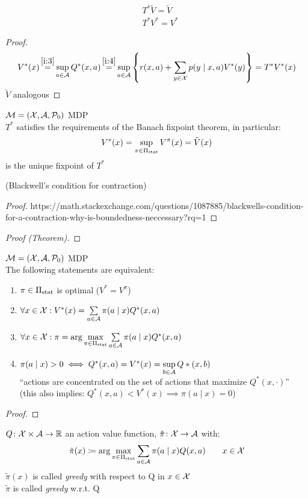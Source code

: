 \begin{corollary}
	\begin{align*}
	&T^*\tilde{V}=\tilde{V}\\
	&T^*V^*=V^*
	\end{align*}
\end{corollary}
\begin{proof}
\begin{align*}
	V^*(x)\xeq{\ref{i:3}}\sup_{a\in\cA}Q^*(x,a)\xeq{\ref{i:4}}\sup_{a\in\cA}\left\{r(x,a)+\sum_{y\in\cX}p(y\mid x,a) V^*(y)\right\} =T^*V^*(x)
\end{align*}
\(\tilde{V}\) analogous
\end{proof}
\begin{thm}\(\mathcal{M}=(\mathcal{X},\mathcal{A},\mathcal{P}_0)\) MDP\\
\(T^*\) satisfies the requirements of the Banach fixpoint theorem, in particular:
	\[V^*(x)=\sup_{\pi\in\Pi_{\textnormal{stat}}}V^\pi(x)=\tilde{V}(x) \]
is the unique fixpoint of \(T^*\)
\end{thm}
\begin{lemma}(Blackwell's condition for contraction)
\end{lemma}
\begin{proof}
https://math.stackexchange.com/questions/1087885/blackwells-condition-for-a-contraction-why-is-boundedness-neccessary?rq=1
\end{proof}
\begin{proof}[Proof (Theorem)]
\end{proof}
\begin{prop}\label{sup is attained}\(\mathcal{M}=(\mathcal{X},\mathcal{A},\mathcal{P}_0)\) MDP\\
The following statements are equivalent:
\begin{enumerate}[label={(\roman*)},font=\normalfont]
\item \(\pi \in\Pi_{\textnormal{stat}}\) is optimal (\(V^*=V^\pi\))
\item \(\forall x\in\mathcal{X}: V^*(x)=\sum\limits_{a\in\mathcal{A}}\pi(a\mid x)Q^*(x,a)\)
\item\label{ii:3} \(\forall x\in\mathcal{X}: \pi=\arg\max\limits_{\pi\in\Pi_{\textnormal{stat}}}\sum\limits_{a\in\mathcal{A}}\pi(a\mid x)Q^*(x,a) \)
\item \(\pi(a\mid x)>0 \iff Q^*(x,a)=V^*(x) =\sup\limits_{b\in\mathcal{A}}Q*(x,b)\) \\
	``actions are concentrated on the set of actions that maximize \(Q^*(x,\cdot)\)''\\
	(this also implies: \(Q^*(x,a)<V^*(x) \implies \pi(a\mid x)=0\))
\end{enumerate}
\end{prop}
\begin{proof}
\end{proof}
\begin{definition}
	\(Q\colon\mathcal{X}\times\mathcal{A}\to\mathbb{R}\) an action value function, \(\tilde{\pi}\colon\mathcal{X}\to\mathcal{A}\) with:
	\[
	\tilde{\pi}(x)\coloneqq\arg\max_{\pi\in\Pi_{\textnormal{stat}}}\sum_{a\in\mathcal{A}}\pi(a\mid x) Q(x,a)\qquad x\in\mathcal{X}
	\]
	\(\tilde{\pi}(x)\) is called \emph{greedy} with respect to Q in \(x\in\mathcal{X}\)\\
	\(\tilde{\pi}\) is called \emph{greedy} w.r.t. Q
\end{definition}

